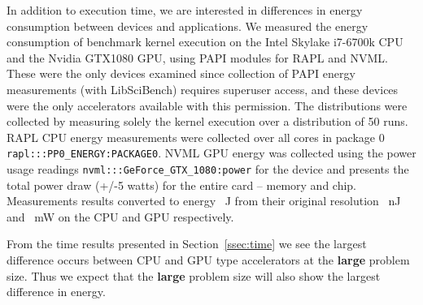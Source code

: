 \documentclass[../document.tex]{subfiles}
\begin{document}
\label{ssec:energy}
	
In addition to execution time, we are interested in differences in energy consumption between devices and applications.
We measured the energy consumption of benchmark kernel execution on the Intel Skylake i7-6700k CPU and the Nvidia GTX1080 GPU, using PAPI modules for RAPL and NVML. 
These were the only devices examined since collection of PAPI energy measurements (with LibSciBench) requires superuser access, and these devices were the only accelerators available with this permission.
The distributions were collected by measuring solely the kernel execution over a distribution of 50 runs.
RAPL CPU energy measurements were collected over all cores in package 0 {\tt rapl:::PP0\_ENERGY:PACKAGE0}.
NVML GPU energy was collected using the power usage readings {\tt nvml:::GeForce\_GTX\_1080:power} for the device and presents the total power draw (+/-5 watts) for the entire card -- memory and chip.
Measurements results converted to energy \SI{}{\joule}  from their original resolution \SI{}{\nano\joule} and \SI{}{\milli\watt} on the CPU and GPU respectively.

From the time results presented in Section~\ref{ssec:time} we see the largest difference occurs between CPU and GPU type accelerators at the {\bf large} problem size.
Thus we expect that the {\bf large} problem size will also show the largest difference in energy.
\end{document}
